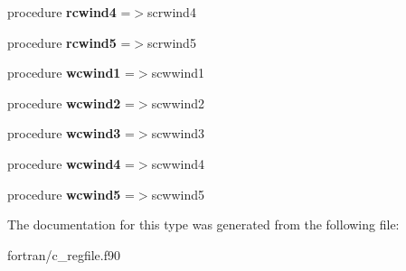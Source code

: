 \begin{DoxyCompactItemize}
procedure {\bfseries rcwind4} =$>$scrwind4
\item 
\mbox{\label{structc__regfile__mod_1_1cfile_a5f050c127d51b1b7a0d9e02e9dcae207}} 
procedure {\bfseries rcwind5} =$>$scrwind5
\item 
\mbox{\label{structc__regfile__mod_1_1cfile_aa2ea1fb45e00533c7345a1f6920583a5}} 
procedure {\bfseries wcwind1} =$>$scwwind1
\item 
\mbox{\label{structc__regfile__mod_1_1cfile_ae6b9c548f0f4d76fdc84f216286d5c9a}} 
procedure {\bfseries wcwind2} =$>$scwwind2
\item 
\mbox{\label{structc__regfile__mod_1_1cfile_a40704e4cfa933f5880462aa0d1c2283d}} 
procedure {\bfseries wcwind3} =$>$scwwind3
\item 
\mbox{\label{structc__regfile__mod_1_1cfile_a1f01af13355476d9008159bf671c8d12}} 
procedure {\bfseries wcwind4} =$>$scwwind4
\item 
\mbox{\label{structc__regfile__mod_1_1cfile_a8b0ae988ac311c12270076a19b1638b2}} 
procedure {\bfseries wcwind5} =$>$scwwind5
\end{DoxyCompactItemize}


The documentation for this type was generated from the following file\+:\begin{DoxyCompactItemize}
\item 
fortran/c\+\_\+regfile.\+f90\end{DoxyCompactItemize}
